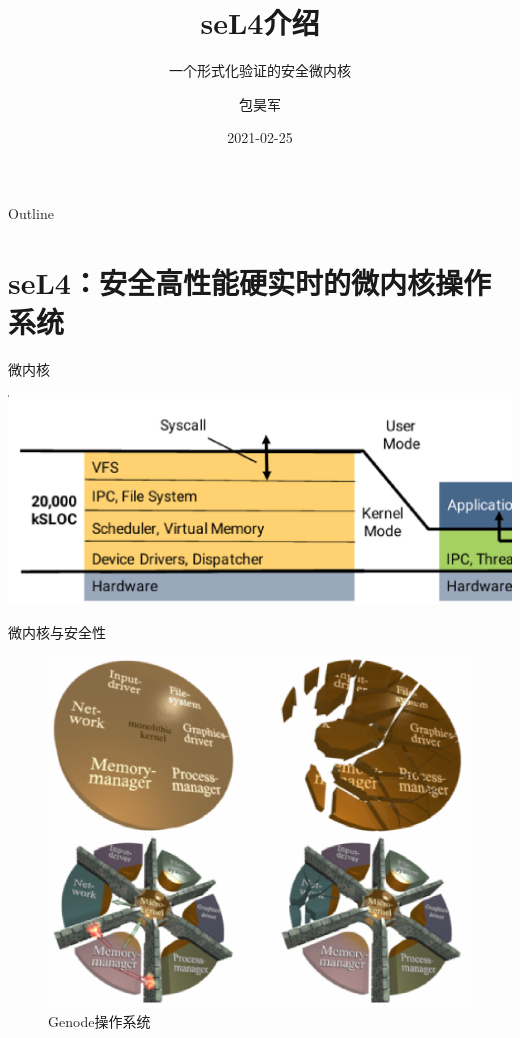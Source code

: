 \documentclass[presentation,dvipdfmx,CJKbookmarks]{beamer}
\date{2021-02-25}
\begin{document}
\begin{CJK*}{UTF8}{simsun}

\title{seL4\thinspace 介绍}
\subtitle{一个形式化验证的安全微内核}
\author{包昊军}

\maketitle
\begin{frame}{Outline}
\tableofcontents
\end{frame}

\CJKtilde

\section{seL4：安全高性能硬实时的微内核操作系统}
\label{sec:orgcdb9bf7}
\begin{frame}[label={sec:org50f4d5c}]{微内核}
\begin{center}
\includegraphics[width=.9\linewidth]{./images/micro-kernel-structure.ps}
\end{center}
\end{frame}

\begin{frame}[label={sec:org5c881e1}]{微内核与安全性}
\begin{figure}[htbp]
\centering
\includegraphics[width=.6\linewidth]{./Genode_intro.ps}
\caption{Genode\thinspace 操作系统}
\end{figure}
\end{frame}


\end{CJK*}
\end{document}
